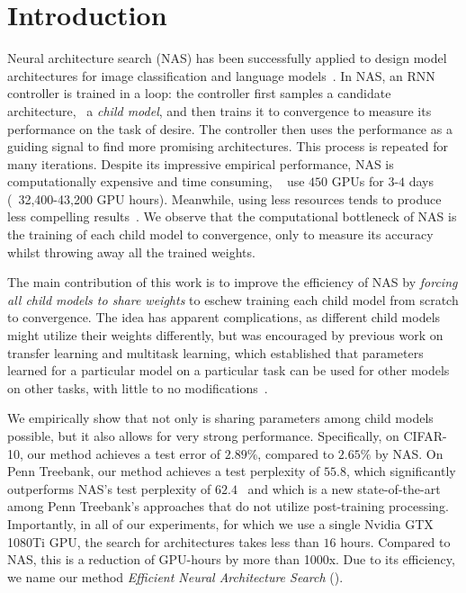 \vspace{-0.8cm}
\section{\label{sec:intro}Introduction}

Neural architecture search (NAS) has been successfully applied to design model architectures for image classification and language models~\citep{nas,nas_module,nas_by_transformation,pnas,hierarchical_nas}. In NAS, an RNN controller is trained in a loop: the controller first samples a candidate architecture, \ie~a \textit{child model}, and then trains it to convergence to measure its performance on the task of desire. The controller then uses the performance as a guiding signal to find more promising architectures. This process is repeated for many iterations. Despite its impressive empirical performance, NAS is computationally expensive and time consuming, \eg~\citet{nas_module} use $450$ GPUs for $3$-$4$ days (\ie~32,400-43,200 GPU hours). Meanwhile, using less resources tends to produce less compelling results~\citep{deep_arc,nas_dqn}. We observe that the computational bottleneck of NAS is the training of each child model to convergence, only to measure its accuracy whilst throwing away all the trained weights.

The main contribution of this work is to improve the efficiency of NAS by \textit{forcing all child models to share weights} to eschew training each child model from scratch to convergence. The idea has apparent complications, as different child models might utilize their weights differently, but was encouraged by previous work on transfer learning and multitask learning, which established that parameters learned for a particular model on a particular task can be used for other models on other tasks, with little to no modifications~\citep{conv_features_transfer,nmt_transfer,multitask_seq2seq}.

We empirically show that not only is sharing parameters among child models possible, but it also allows for very strong performance. Specifically, on CIFAR-10, our method achieves a test error of $2.89\%$, compared to $2.65\%$ by NAS. On Penn Treebank, our method achieves a test perplexity of $55.8$, which significantly outperforms NAS's test perplexity of $62.4$~\citep{nas} and which is a new state-of-the-art among Penn Treebank's approaches that do not utilize post-training processing. Importantly, in all of our experiments, for which we use a single Nvidia GTX 1080Ti GPU, the search for architectures takes less than $16$ hours. Compared to NAS, this is a reduction of GPU-hours by more than 1000x. Due to its efficiency, we name our method \textit{Efficient Neural Architecture Search} (\enas).